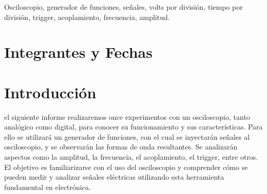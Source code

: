 \documentclass{plantilla}
\begin{document}
\maketitle

\begin{abstract}
En este informe se experimentará con un osciloscopio analógico y luego uno digital, su funcionamiento en todos sus apartados, para ello se dispondra de un generador de funciones con el cual inyectaremos señales al mismo.
\end{abstract}

\begin{IEEEkeywords}
Osciloscopio, generador de funciones, señales, volts por división, tiempo por división, trigger, acoplamiento, frecuencia, amplitud.
\end{IEEEkeywords}

\section{Integrantes y Fechas}

\begin{table}[H]
\end{table}

\section{Introducción}
 el siguiente informe realizaremos once experimentos con un osciloscopio, tanto analógico como digital, para conocer su funcionamiento y sus características. Para ello se utilizará un generador de funciones, con el cual se inyectarán señales al osciloscopio, y se observarán las formas de onda resultantes. Se analizarán aspectos como la amplitud, la frecuencia, el acoplamiento, el trigger, entre otros. El objetivo es familiarizarse con el uso del osciloscopio y comprender cómo se pueden medir y analizar señales eléctricas utilizando esta herramienta fundamental en electrónica.
\end{document}
